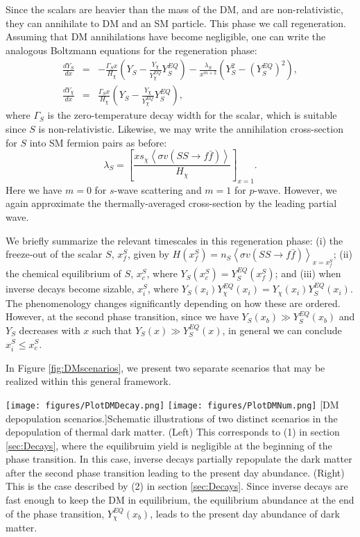 Since the scalars are heavier than the mass of the DM, and are non-relativistic, they can annihilate to DM and an SM particle. This phase we call regeneration. Assuming that DM annihilations have become negligible, one can write the analogous Boltzmann equations for the regeneration phase:
\begin{eqnarray}
	\frac{dY_S}{dx} &=& -\frac{\Gamma_S x}{H_{\chi}} \left( Y_S - \frac{Y_{\chi}}{Y^{EQ}_{\chi}}Y^{EQ}_S\right) - \frac{\lambda_S}{x^{m+2}}\left( Y^2_S - (Y^{EQ}_S)^2\right), \\
	\frac{dY_{\chi}}{dx} &=& \frac{\Gamma_S x}{H_{\chi}} \left( Y_S - \frac{Y_{\chi}}{Y^{EQ}_{\chi}}Y^{EQ}_S\right),	
\end{eqnarray}
where $\Gamma_S$ is the zero-temperature decay width for the scalar, which is suitable since $S$ is non-relativistic. Likewise, we may write the annihilation cross-section for $S$ into SM fermion pairs as before:
\begin{equation}
\lambda_S = \left[ \frac{x s_{\chi} \left \langle \sigma v (SS \rightarrow f\bar{f})\right \rangle}{H_{\chi}}\right]_{x=1}.
\end{equation}
Here we have $m=0$ for $s$-wave scattering and $m=1$ for $p$-wave. However, we again approximate the thermally-averaged cross-section by the leading partial wave.

We briefly summarize the relevant timescales in this regeneration phase: (i) the freeze-out of the scalar $S$, $x^S_f$, given by $H(x^S_f)=n_S \left \langle \sigma v (SS \rightarrow f\bar{f})\right \rangle_{x=x^S_f}$; (ii) the chemical equilibrium of $S$, $x^S_c$, where $Y_S (x^S_c)=Y^{EQ}_S (x^S_f)$; and (iii) when inverse decays become sizable, $x^S_i$, where $Y_S (x_i) Y^{EQ}_{\chi} (x_i) = Y_{\chi} (x_i) Y^{EQ}_S (x_i)$. The phenomenology changes significantly depending on how these are ordered. However, at the second phase transition, since we have $Y_S(x_b) \gg Y^{EQ}_S (x_b)$ and $Y_S$ decreases with $x$ such that $Y_S(x) \gg Y^{EQ}_S (x)$, in general we can conclude $x^S_i \leq x^S_c$.

In Figure \ref{fig:DMscenarios}, we present two separate scenarios that may be realized within this general framework.
\newpage
\begin{center}
	\texttt{[image: figures/PlotDMDecay.png]}
	\texttt{[image: figures/PlotDMNum.png]}
	[DM depopulation scenarios.]{Schematic illustrations of two distinct scenarios in the depopulation of thermal dark matter. (Left) This corresponds to (1) in section \ref{sec:Decays}, where the equilibruim yield is negligible at the beginning of the phase transition. In this case, inverse decays partially repopulate the dark matter after the second phase transition leading to the present day abundance.		
	(Right) This is the case described by (2) in section \ref{sec:Decays}. Since inverse decays are fast enough to keep the DM in equilibrium, the equilibrium abundance at the end of the phase transition, $Y^{EQ}_{\chi}(x_b)$, leads to the present day abundance of dark matter.}
	\label{fig:DMscenarios}
\end{center}

